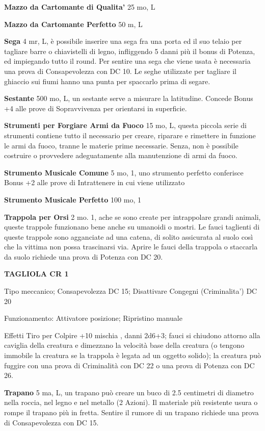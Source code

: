 \documentclass[a4paper,11pt,twoside,openany]{book}
\begin{document}
{\textbf{Mazzo da Cartomante di Qualita'} 25 mo, L

\textbf{Mazzo da Cartomante Perfetto} 50 m, L

\textbf{Sega} 4 mr, L, è possibile inserire una sega fra una porta ed il suo telaio per tagliare barre o chiavistelli di legno, infliggendo 5 danni più il bonus di Potenza, ed impiegando tutto il round. 
Per sentire una sega che viene usata è necessaria una prova di Consapevolezza con DC 10. Le seghe utilizzate per tagliare il ghiaccio sui fiumi hanno una punta per spaccarlo prima di segare.

\textbf{Sestante} 500 mo, L, un sestante serve a misurare la latitudine. Concede Bonus +4 alle prove di Sopravvivenza per orientarsi in superficie.

\textbf{Strumenti per Forgiare Armi da Fuoco} 15 mo, L, questa piccola serie di strumenti contiene tutto il necessario per creare, riparare e rimettere in funzione le armi da fuoco, tranne le materie prime necessarie. Senza, non è possibile costruire o provvedere adeguatamente alla manutenzione di armi da fuoco.

\textbf{Strumento Musicale Comune} 5 mo, 1, uno strumento perfetto conferisce Bonus +2 alle prove di Intrattenere in cui viene utilizzato

\textbf{Strumento Musicale Perfetto} 100 mo, 1

\textbf{Trappola per Orsi} 2 mo. 1, ache se sono create per intrappolare grandi animali, queste trappole funzionano bene anche su umanoidi o mostri. Le fauci taglienti di queste trappole sono agganciate ad una catena, di solito assicurata al suolo così che la vittima non possa trascinarsi via. Aprire le fauci della trappola o staccarla da suolo richiede una prova di Potenza con DC 20.

\textbf{TAGLIOLA CR 1}

Tipo meccanico; Consapevolezza DC 15; Disattivare Congegni (Criminalita') DC 20

Funzionamento:  Attivatore posizione; Ripristino manuale

Effetti Tiro per Colpire +10 mischia , danni 2d6+3; fauci si chiudono attorno alla caviglia della creatura e dimezzano la velocità base della creatura (o tengono immobile la creatura se la trappola è legata ad un oggetto solido); la creatura può fuggire con una prova di Criminalità con DC 22 o una prova di Potenza con DC 26.

\textbf{Trapano} 5 ma, L, un trapano può creare un buco di 2.5 centimetri di diametro nella roccia, nel legno e nel metallo (2 Azioni). Il materiale più resistente usura o rompe il trapano più in fretta. Sentire il rumore di un trapano richiede una prova di Consapevolezza con DC 15.

}
\end{document}
